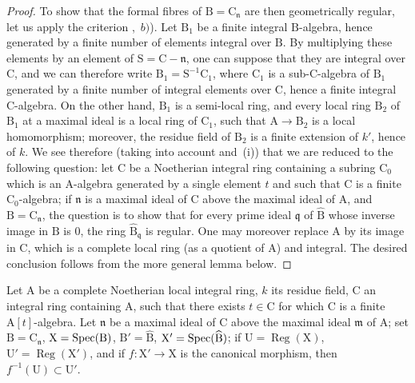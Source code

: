 \begin{proof}
To show that the formal fibres of $\mathrm{B}=\mathrm{C}_\mathfrak{n}$ are then geometrically regular, let us apply the criterion ,~$b)$).
Let $\mathrm{B}_1$ be a finite integral $\mathrm{B}$-algebra, hence generated by a finite number of elements integral over $\mathrm{B}$.
By multiplying these elements by an element of $\mathrm{S}=\mathrm{C}-\mathfrak{n}$, one can suppose that they are integral over $\mathrm{C}$, and we can therefore write $\mathrm{B}_1=\mathrm{S}^{-1}\mathrm{C}_1$, where $\mathrm{C}_1$ is a sub-C-algebra of $\mathrm{B}_1$ generated by a finite number of integral elements over $\mathrm{C}$, hence a finite integral C-algebra.
On the other hand, $\mathrm{B}_1$ is a semi-local ring, and every local ring $\mathrm{B}_2$ of $\mathrm{B}_1$ at a maximal ideal is a local ring of $\mathrm{C}_1$, such that $\mathrm{A}\to\mathrm{B}_2$ is a local homomorphism; moreover, the residue field of $\mathrm{B}_2$ is a finite extension of $k'$, hence of $k$.
We see therefore (taking into account  and~(i)) that we are reduced to the following question: let $\mathrm{C}$ be a Noetherian integral ring containing a subring $\mathrm{C}_0$ which is an $\mathrm{A}$-algebra generated by a single element $t$ and such that $\mathrm{C}$ is a finite $\mathrm{C}_0$-algebra; if $\mathfrak{n}$ is a maximal ideal of $\mathrm{C}$
above the maximal ideal of $\mathrm{A}$, and $\mathrm{B}=\mathrm{C}_\mathfrak{n}$, the question is to show that for every prime ideal $\mathfrak{q}$ of $\widehat{\mathrm{B}}$ whose inverse image in $\mathrm{B}$ is $0$, the ring $\widehat{\mathrm{B}}_\mathfrak{q}$ is regular.
One may moreover replace $\mathrm{A}$ by its image in $\mathrm{C}$, which is a complete local ring (as a quotient of $\mathrm{A}$) and integral. The desired conclusion follows from the more general lemma below.
\end{proof}

\begin{lemma}[7.4.4.2]
\label{IV.7.4.4.2}
Let $\mathrm{A}$ be a complete Noetherian local integral ring, $k$ its residue field, $\mathrm{C}$ an integral ring containing $\mathrm{A}$, such that there exists $t\in\mathrm{C}$ for which $\mathrm{C}$ is a finite $\mathrm{A}[t]$-algebra.
Let $\mathfrak{n}$ be a maximal ideal of $\mathrm{C}$ above the maximal ideal $\mathfrak{m}$ of $\mathrm{A}$; set $\mathrm{B}=\mathrm{C}_\mathfrak{n}$, $\mathrm{X}=\operatorname{Spec}(\mathrm{B})$, $\mathrm{B}'=\widehat{\mathrm{B}}$, $\mathrm{X}'=\operatorname{Spec}(\widehat{\mathrm{B}})$; if $\mathrm{U}=\operatorname{Reg}(\mathrm{X})$, $\mathrm{U}'=\operatorname{Reg}(\mathrm{X}')$, and if $f:\mathrm{X}'\to\mathrm{X}$ is the canonical morphism, then $f^{-1}(\mathrm{U})\subset\mathrm{U}'$.
\end{lemma}

